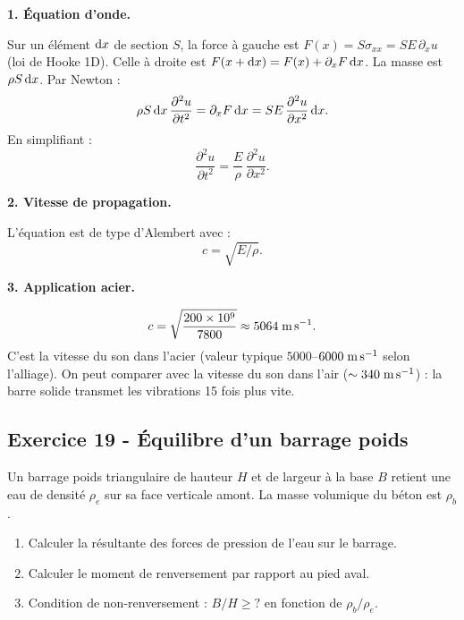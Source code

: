 \documentclass[12pt,a4paper]{article}
\begin{document}
\begin{boitecorrige}

\textbf{1. Équation d'onde.}

Sur un élément $\mathrm{d} x$ de section $S$, la force à gauche est $F(x) = S\sigma_{xx} = SE\,\partial_x u$ (loi de Hooke 1D). Celle à droite est $F(x+\mathrm{d} x) = F(x) + \partial_x F\,\mathrm{d} x$. La masse est $\rho S\,\mathrm{d} x$. Par Newton :
\[
\rho S\,\mathrm{d} x\,\frac{\partial^2 u}{\partial t^2} = \partial_x F\,\mathrm{d} x = SE\,\frac{\partial^2 u}{\partial x^2}\,\mathrm{d} x.
\]
En simplifiant :
\[
\frac{\partial^2 u}{\partial t^2} = \frac{E}{\rho}\,\frac{\partial^2 u}{\partial x^2}.
\]

\textbf{2. Vitesse de propagation.}

L'équation est de type d'Alembert avec :
\[
c = \sqrt{E/\rho}.
\]

\textbf{3. Application acier.}

\[
c = \sqrt{\frac{200\times 10^9}{7800}} \approx 5064\;\text{m\,s}^{-1}.
\]
C'est la vitesse du son dans l'acier (valeur typique $5000$--$6000\;\text{m\,s}^{-1}$ selon l'alliage). On peut comparer avec la vitesse du son dans l'air ($\sim 340\;\text{m\,s}^{-1}$) : la barre solide transmet les vibrations 15 fois plus vite.

\end{boitecorrige}

\subsection*{Exercice 19 - Équilibre d'un barrage poids \niveau{\moyen}}

\begin{boiteexercice}
Un barrage poids triangulaire de hauteur $H$ et de largeur à la base $B$ retient une eau de densité $\rho_e$ sur sa face verticale amont. La masse volumique du béton est $\rho_b$.
\begin{enumerate}
  \item Calculer la résultante des forces de pression de l'eau sur le barrage.
  \item Calculer le moment de renversement par rapport au pied aval.
  \item Condition de non-renversement : $B/H \ge ?$ en fonction de $\rho_b/\rho_e$.
\end{enumerate}
\end{boiteexercice}
\end{document}
